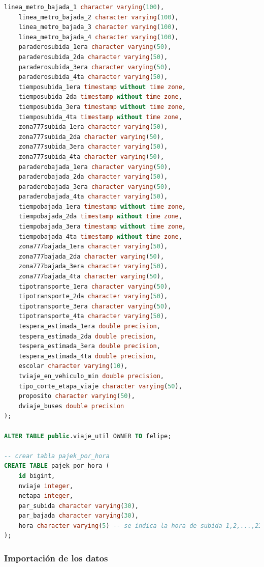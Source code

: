 \documentclass[12pt]{article}
\begin{document}
\begin{lstlisting}[breaklines=true, 
				   language=SQL,  
				   title=asd, 
				   caption=Instalacion de postgres,
				   label=fig:instalar_postgres]
    linea_metro_bajada_1 character varying(100),
    linea_metro_bajada_2 character varying(100),
    linea_metro_bajada_3 character varying(100),
    linea_metro_bajada_4 character varying(100),
    paraderosubida_1era character varying(50),
    paraderosubida_2da character varying(50),
    paraderosubida_3era character varying(50),
    paraderosubida_4ta character varying(50),
    tiemposubida_1era timestamp without time zone,
    tiemposubida_2da timestamp without time zone,
    tiemposubida_3era timestamp without time zone,
    tiemposubida_4ta timestamp without time zone,
    zona777subida_1era character varying(50),
    zona777subida_2da character varying(50),
    zona777subida_3era character varying(50),
    zona777subida_4ta character varying(50),
    paraderobajada_1era character varying(50),
    paraderobajada_2da character varying(50),
    paraderobajada_3era character varying(50),
    paraderobajada_4ta character varying(50),
    tiempobajada_1era timestamp without time zone,
    tiempobajada_2da timestamp without time zone,
    tiempobajada_3era timestamp without time zone,
    tiempobajada_4ta timestamp without time zone,
    zona777bajada_1era character varying(50),
    zona777bajada_2da character varying(50),
    zona777bajada_3era character varying(50),
    zona777bajada_4ta character varying(50),
    tipotransporte_1era character varying(50),
    tipotransporte_2da character varying(50),
    tipotransporte_3era character varying(50),
    tipotransporte_4ta character varying(50),
    tespera_estimada_1era double precision,
    tespera_estimada_2da double precision,
    tespera_estimada_3era double precision,
    tespera_estimada_4ta double precision,
    escolar character varying(10),
    tviaje_en_vehiculo_min double precision,
    tipo_corte_etapa_viaje character varying(50),
    proposito character varying(50),
    dviaje_buses double precision
);

ALTER TABLE public.viaje_util OWNER TO felipe;

-- crear tabla pajek_por_hora
CREATE TABLE pajek_por_hora (
    id bigint,
    nviaje integer,
    netapa integer,
    par_subida character varying(30),
    par_bajada character varying(30),
    hora character varying(5) -- se indica la hora de subida 1,2,...,23 o un rango 1-2, 21-00, ...
);

\end{lstlisting}

		\subsubsection{Importación de los datos}
\end{document}
